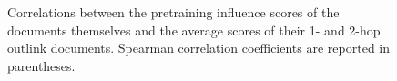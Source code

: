 \begin{figure}[t]
    \centering
    \caption{Correlations between the pretraining influence scores of the documents themselves and the average scores of their 1- and 2-hop outlink documents.
    Spearman correlation coefficients are reported in parentheses.
    }
    \label{fig:correlation}
\end{figure}
